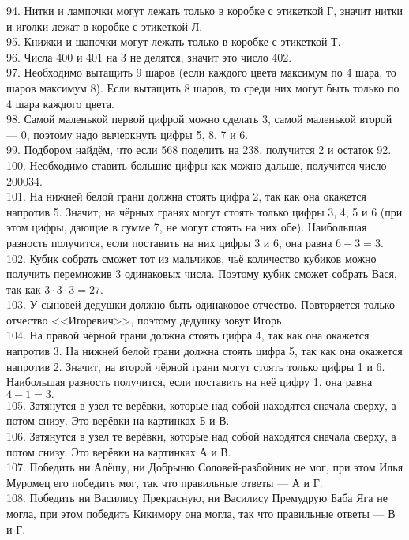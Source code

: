 94. Нитки и лампочки могут лежать только в коробке с этикеткой Г, значит нитки и иголки лежат в коробке с этикеткой Л.\\
95. Книжки и шапочки могут лежать только в коробке с этикеткой Т.\\
96. Числа 400 и 401 на 3 не делятся, значит это число 402.\\
97. Необходимо вытащить 9 шаров (если каждого цвета максимум по 4 шара, то шаров максимум 8). Если вытащить 8 шаров, то среди них могут быть только по 4 шара каждого цвета.\\
98. Самой маленькой первой цифрой можно сделать 3, самой маленькой второй --- 0, поэтому надо вычеркнуть цифры 5, 8, 7 и 6.\\
99. Подбором найдём, что если 568 поделить на 238, получится 2 и остаток 92.\\
100. Необходимо ставить большие цифры как можно дальше, получится число 200034.\\
101. На нижней белой грани должна стоять цифра 2, так как она окажется напротив 5. Значит, на чёрных гранях могут стоять только цифры 3, 4, 5 и 6 (при этом цифры, дающие в сумме 7, не могут стоять на них обе). Наибольшая разность получится, если поставить на них цифры 3 и 6, она равна $6-3=3.$\\
102. Кубик собрать сможет тот из мальчиков, чьё количество кубиков можно получить перемножив 3 одинаковых числа. Поэтому кубик сможет собрать Вася, так как $3\cdot3\cdot3=27.$\\
103. У сыновей дедушки должно быть одинаковое отчество. Повторяется только отчество <<Игоревич>>, поэтому дедушку зовут Игорь.\\
104. На правой чёрной грани должна стоять цифра 4, так как она окажется напротив 3. На нижней белой грани должна стоять цифра 5, так как она окажется напротив 2. Значит, на второй чёрной грани могут стоять только цифры 1 и 6. Наибольшая разность получится, если поставить на неё цифру 1, она равна $4-1=3.$\\
105. Затянутся в узел те верёвки, которые над собой находятся сначала сверху, а потом снизу. Это верёвки на картинках Б и В.\\
106. Затянутся в узел те верёвки, которые над собой находятся сначала сверху, а потом снизу. Это верёвки на картинках А и В.\\
107. Победить ни Алёшу, ни Добрыню Соловей-разбойник не мог, при этом Илья Муромец его победить мог, так что правильные ответы --- А и Г.\\
108. Победить ни Василису Прекрасную, ни Василису Премудрую Баба Яга не могла, при этом победить Кикимору она могла, так что правильные ответы --- В и Г.\\
